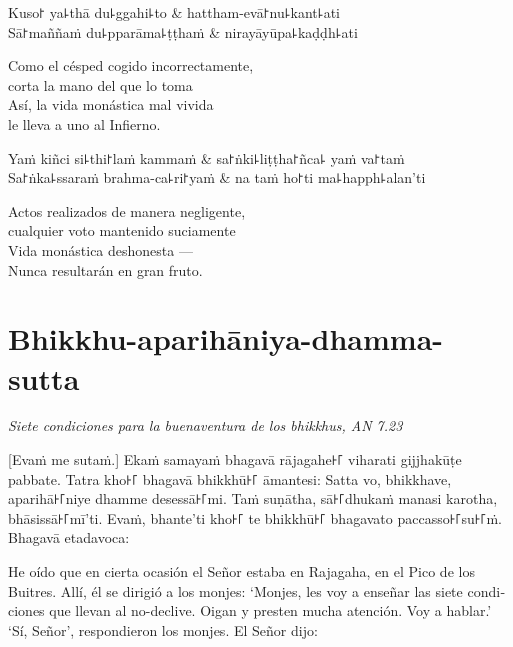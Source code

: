 \clearpage

\begin{twochants}
	Kuso꜓ ya꜕thā du꜕ggahi꜕to & hattham-evā꜓nu꜕kant꜕ati \\
	Sā꜓maññaṁ du꜕pparāma꜕ṭṭhaṁ & nirayāyūpa꜕kaḍḍh꜕ati \\
\end{twochants}

\begin{english}
	Como el césped cogido incorrectamente,\\
	corta la mano del que lo toma\\
	Así, la vida monástica mal vivida\\
	le lleva a uno al Infierno.
\end{english}

\begin{twochants}
	Yaṁ kiñci si꜕thi꜓laṁ kammaṁ & sa꜓ṅki꜕liṭṭha꜓ñca꜕ yaṁ va꜓taṁ \\
	Sa꜓ṅka꜕ssaraṁ brahma-ca꜕ri꜓yaṁ & na taṁ ho꜓ti ma꜕happh꜕alan'ti \\
\end{twochants}

\begin{english}
	Actos realizados de manera negligente,\\
	cualquier voto mantenido suciamente\\
	Vida monástica deshonesta ---\\
	Nunca resultarán en gran fruto.
\end{english}

\chapter[Aparihāniya-dhamma-sutta]{Bhikkhu-aparihāniya-dhamma-sutta}

\emph{Siete condiciones para la buenaventura de los bhikkhus, AN 7.23}

\begin{leader}
\end{leader}

[Evaṁ me sutaṁ.] Ekaṁ samayaṁ bhagavā rājagahe꜔꜒ viharati gijjhakūṭe pabbate.
Tatra kho꜔꜒ bhagavā bhikkhū꜔꜒ āmantesi: Satta vo, bhikkhave, aparihā꜔꜒niye dhamme
desessā꜔꜒mi. Taṁ suṇātha, sā꜔꜒dhukaṁ manasi karotha, bhāsissā꜔꜒mī'ti. Evaṁ, bhante'ti
kho꜔꜒ te bhikkhū꜔꜒ bhagavato paccasso꜔꜒su꜔꜒ṁ. Bhagavā etadavoca:

\begin{english}
  He oído que en cierta ocasión el Señor estaba en Rajagaha, en el Pico de los Buitres. Allí, él se dirigió a los monjes: `Monjes, les voy a enseñar las siete condiciones que llevan al no-declive. Oigan y presten mucha atención. Voy a hablar.' `Sí, Señor', respondieron los monjes. El Señor dijo:
\end{english}

